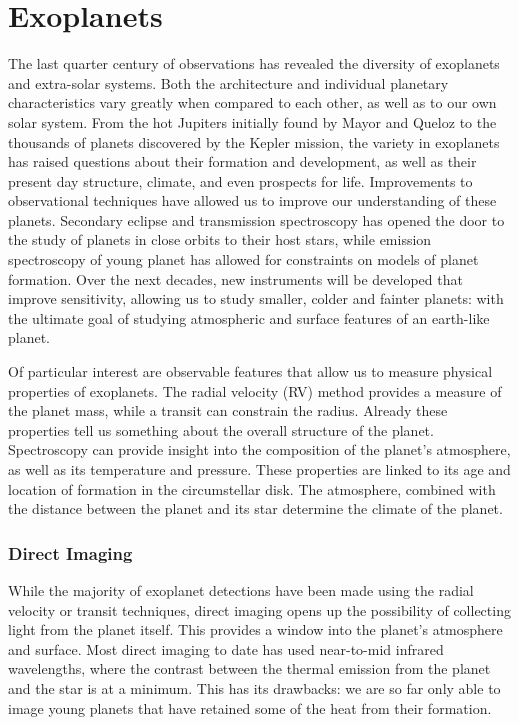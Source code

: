 \section{Exoplanets}
The last quarter century of observations has revealed the diversity of exoplanets and extra-solar systems.
Both the architecture and individual planetary characteristics vary greatly when compared to each other, as well as to our own solar system.
From the hot Jupiters initially found by Mayor and Queloz \parencite{Mayor1995} to the thousands of planets discovered by the Kepler mission, the variety in exoplanets has raised questions about their formation and development, as well as their present day structure, climate, and even prospects for life.
Improvements to observational techniques have allowed us to improve our understanding of these planets.
Secondary eclipse and transmission spectroscopy has opened the door to the study of planets in close orbits to their host stars, while emission spectroscopy of young planet has allowed for constraints on models of planet formation.
Over the next decades, new instruments will be developed that improve sensitivity, allowing us to study smaller, colder and fainter planets: with the ultimate goal of studying atmospheric and surface features of an earth-like planet.

Of particular interest are observable features that allow us to measure physical properties of exoplanets.
The radial velocity (RV) method provides a measure of the planet mass, while a transit can constrain the radius.
Already these properties tell us something about the overall structure of the planet.
Spectroscopy can provide insight into the composition of the planet's atmosphere, as well as its temperature and pressure.
These properties are linked to its age and location of formation in the circumstellar disk.
The atmosphere, combined with the distance between the planet and its star determine the climate of the planet.

\subsubsection{Direct Imaging}
While the majority of exoplanet detections have been made using the radial velocity or transit techniques, direct imaging opens up the possibility of collecting light from the planet itself.
This provides a window into the planet's atmosphere and surface.
Most direct imaging to date has used near-to-mid infrared wavelengths, where the contrast between the thermal emission from the planet and the star is at a minimum.
This has its drawbacks: we are so far only able to image young planets that have retained some of the heat from their formation.

